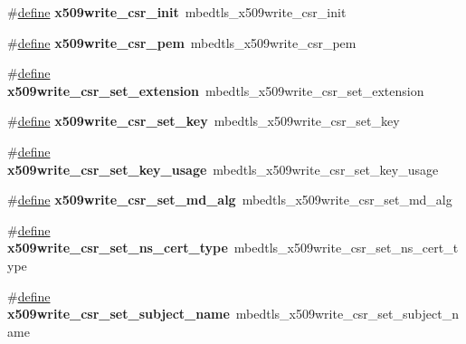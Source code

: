 \begin{DoxyCompactItemize}
\mbox{\label{compat-1_83_8h_a6ace4eb79d9bdd7f0abd1d8a427c600c}} 
\#\hyperlink{structdefine}{define} {\bfseries x509write\+\_\+csr\+\_\+init}~mbedtls\+\_\+x509write\+\_\+csr\+\_\+init
\item 
\mbox{\label{compat-1_83_8h_a33f32f2e81ab0ce8d8f1c10af191fad6}} 
\#\hyperlink{structdefine}{define} {\bfseries x509write\+\_\+csr\+\_\+pem}~mbedtls\+\_\+x509write\+\_\+csr\+\_\+pem
\item 
\mbox{\label{compat-1_83_8h_a9d9c6b65b91d8f274f82f2277143b1fe}} 
\#\hyperlink{structdefine}{define} {\bfseries x509write\+\_\+csr\+\_\+set\+\_\+extension}~mbedtls\+\_\+x509write\+\_\+csr\+\_\+set\+\_\+extension
\item 
\mbox{\label{compat-1_83_8h_a1c8d3c7ea098b215d067d5e394620bd1}} 
\#\hyperlink{structdefine}{define} {\bfseries x509write\+\_\+csr\+\_\+set\+\_\+key}~mbedtls\+\_\+x509write\+\_\+csr\+\_\+set\+\_\+key
\item 
\mbox{\label{compat-1_83_8h_a779ef77637b61d3146424dd1d6072a4a}} 
\#\hyperlink{structdefine}{define} {\bfseries x509write\+\_\+csr\+\_\+set\+\_\+key\+\_\+usage}~mbedtls\+\_\+x509write\+\_\+csr\+\_\+set\+\_\+key\+\_\+usage
\item 
\mbox{\label{compat-1_83_8h_a5a300bba5cc1919bee05f707fd586637}} 
\#\hyperlink{structdefine}{define} {\bfseries x509write\+\_\+csr\+\_\+set\+\_\+md\+\_\+alg}~mbedtls\+\_\+x509write\+\_\+csr\+\_\+set\+\_\+md\+\_\+alg
\item 
\mbox{\label{compat-1_83_8h_a0bba58ef05e6470993378f6117f6248b}} 
\#\hyperlink{structdefine}{define} {\bfseries x509write\+\_\+csr\+\_\+set\+\_\+ns\+\_\+cert\+\_\+type}~mbedtls\+\_\+x509write\+\_\+csr\+\_\+set\+\_\+ns\+\_\+cert\+\_\+type
\item 
\mbox{\label{compat-1_83_8h_a4b5083b90eb884f03fbed7e74170125b}} 
\#\hyperlink{structdefine}{define} {\bfseries x509write\+\_\+csr\+\_\+set\+\_\+subject\+\_\+name}~mbedtls\+\_\+x509write\+\_\+csr\+\_\+set\+\_\+subject\+\_\+name
\item 
\mbox{\label{compat-1_83_8h_a710e106c84b0a26c46745aabf14d0987}} 

\end{DoxyCompactItemize}
